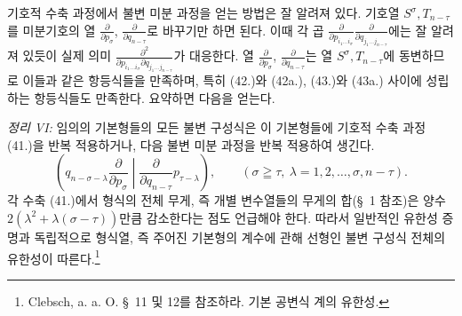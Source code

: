 
기호적 수축 과정에서 불변 미분 과정을 얻는 방법은 잘 알려져 있다. 기호열 $S^\sigma,T_{n-\tau}$를 미분기호의 열 $\frac{\partial}{\partial p_\sigma}$, $\frac{\partial}{\partial q_{n-\tau}}$로 바꾸기만 하면 된다. 이때 각 곱 $\frac{\partial}{\partial p_{i_1\ldots i_\sigma}}\frac{\partial}{\partial q_{j_1\ldots j_{n-\tau}}}$에는 잘 알려져 있듯이 실제 의미 $\frac{\partial^2}{\partial p_{i_1\ldots i_\sigma}\partial q_{j_1\ldots j_{n-\tau}}}$가 대응한다. 열 $\frac{\partial}{\partial p_\sigma}$, $\frac{\partial}{\partial q_{n-\tau}}$는 열 $S^\sigma,T_{n-\tau}$에 동변하므로 이들과 같은 항등식들을 만족하며, 특히 (42.)와 (42a.), (43.)와 (43a.) 사이에 성립하는 항등식들도 만족한다. 요약하면 다음을 얻는다.

\emph{정리 VI:} 임의의 기본형들의 모든 불변 구성식은 이 기본형들에 기호적 수축 과정 (41.)을 반복 적용하거나, 다음 불변 미분 과정을 반복 적용하여 생긴다.
\begin{equation}
 \left(q_{n-\sigma-\lambda}\frac{\partial}{\partial p_\sigma}\middle|\frac{\partial}{\partial q_{n-\tau}}p_{\tau-\lambda}\right),
 \qquad(\sigma\geqq\tau,\ \lambda=1,2,\ldots,\sigma,n-\tau).
\tag{45}
\end{equation}
각 수축 (41.)에서 형식의 전체 무게, 즉 개별 변수열들의 무게의 합(\S\ 1 참조)은 양수 $2(\lambda^2+\lambda(\sigma-\tau))$만큼 감소한다는 점도 언급해야 한다. 따라서 일반적인 유한성 증명과 독립적으로 형식열, 즉 주어진 기본형의 계수에 관해 선형인 불변 구성식 전체의 유한성이 따른다.\footnote{Clebsch, a. a. O. \S\ 11 및 12를 참조하라. 기본 공변식 계의 유한성.}
